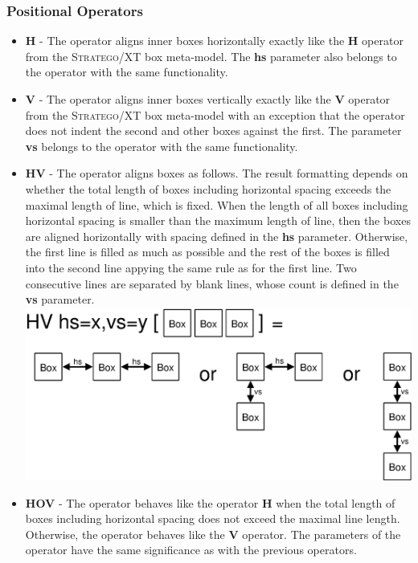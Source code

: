 \documentclass[12pt,notitlepage,a4paper]{report}
\begin{document}
\subsubsection{Positional Operators}
\begin{itemize}
\item \textbf{H} - The operator aligns inner boxes horizontally exactly like the \textbf{H} operator from the \textsc{Stratego/XT} box meta-model.  The \textbf{hs} parameter also belongs to the operator with the same functionality.
\item \textbf{V} - The operator aligns inner boxes vertically exactly like the \textbf{V} operator from the \textsc{Stratego/XT} box meta-model with an exception that the operator does not indent the second and other boxes against the first.  The parameter \textbf{vs} belongs to the operator with the same functionality.
\item \textbf{HV} -  The operator aligns boxes as follows. The result formatting depends on whether the total length of boxes including horizontal spacing exceeds the maximal length of line, which is fixed. When the length of all boxes including horizontal spacing is smaller than the maximum length of line, then the boxes are aligned horizontally with spacing defined in the \textbf{hs} parameter. Otherwise, the first line is filled as much as possible and the rest of the boxes is filled into the second line appying the same rule as for the first line. Two consecutive lines are separated by blank lines, whose count is defined in the \textbf{vs}  parameter.
\includegraphics[scale=0.4]{pictures/Brand-Visser-HV.eps}
\item \textbf{HOV} - The operator behaves like the operator \textbf{H} when the total length of boxes including horizontal spacing does not exceed the maximal line length. Otherwise, the operator behaves like the \textbf{V} operator. The parameters of the operator have the same significance as with the previous operators.

\end{itemize}
\end{document}
